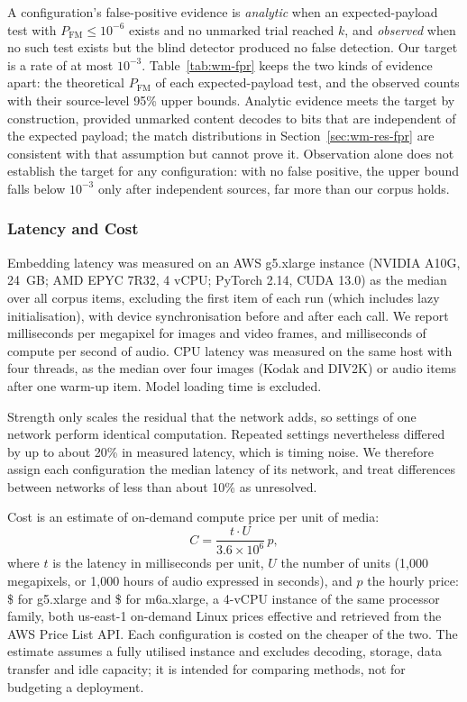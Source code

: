 A configuration's false-positive evidence is \emph{analytic} when an expected-payload test with $P_{\mathrm{FM}}\le10^{-6}$ exists and no unmarked trial reached $k$, and \emph{observed} when no such test exists but the blind detector produced no false detection. Our target is a rate of at most $10^{-3}$. Table~\ref{tab:wm-fpr} keeps the two kinds of evidence apart: the theoretical $P_{\mathrm{FM}}$ of each expected-payload test, and the observed counts with their source-level 95\% upper bounds. Analytic evidence meets the target by construction, provided unmarked content decodes to bits that are independent of the expected payload; the match distributions in Section~\ref{sec:wm-res-fpr} are consistent with that assumption but cannot prove it. Observation alone does not establish the target for any configuration: with no false positive, the upper bound falls below $10^{-3}$ only after  independent sources, far more than our corpus holds.

\subsubsection{Latency and Cost}
\label{sec:wm-cost}
Embedding latency was measured on an AWS g5.xlarge instance (NVIDIA A10G, 24~GB; AMD EPYC 7R32, 4 vCPU; PyTorch 2.14, CUDA 13.0) as the median over all corpus items, excluding the first item of each run (which includes lazy initialisation), with device synchronisation before and after each call. We report milliseconds per megapixel for images and video frames, and milliseconds of compute per second of audio. CPU latency was measured on the same host with four threads, as the median over four images (Kodak and DIV2K) or audio items after one warm-up item. Model loading time is excluded.

Strength only scales the residual that the network adds, so settings of one network perform identical computation. Repeated settings nevertheless differed by up to about 20\% in measured latency, which is timing noise. We therefore assign each configuration the median latency of its network, and treat differences between networks of less than about 10\% as unresolved.

Cost is an estimate of on-demand compute price per unit of media:
\begin{equation}
C = \frac{t \cdot U}{3.6\times10^{6}}\, p,
\end{equation}
where $t$ is the latency in milliseconds per unit, $U$ the number of units (1{,}000 megapixels, or 1{,}000 hours of audio expressed in seconds), and $p$ the hourly price: \$ for g5.xlarge and \$ for m6a.xlarge, a 4-vCPU instance of the same processor family, both us-east-1 on-demand Linux prices effective  and retrieved from the AWS Price List API. Each configuration is costed on the cheaper of the two. The estimate assumes a fully utilised instance and excludes decoding, storage, data transfer and idle capacity; it is intended for comparing methods, not for budgeting a deployment.

